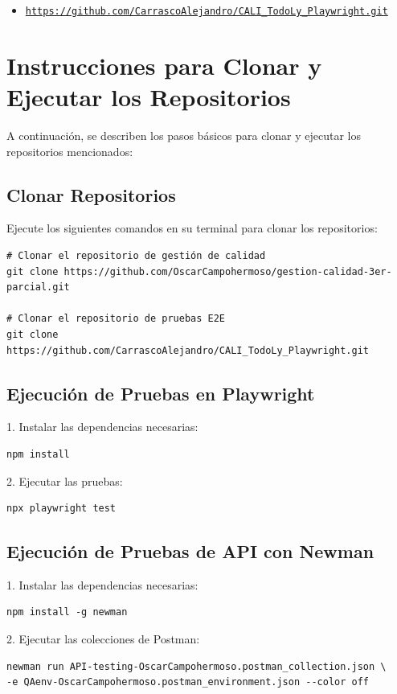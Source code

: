 \documentclass{report}
\begin{document}
\begin{itemize}
    \item \href{https://github.com/CarrascoAlejandro/CALI_TodoLy_Playwright.git}{\texttt{https://github.com/CarrascoAlejandro/CALI\_TodoLy\_Playwright.git}}
\end{itemize}

\section{Instrucciones para Clonar y Ejecutar los Repositorios}

A continuación, se describen los pasos básicos para clonar y ejecutar los repositorios mencionados:

\subsection{Clonar Repositorios}
Ejecute los siguientes comandos en su terminal para clonar los repositorios:
\begin{verbatim}
# Clonar el repositorio de gestión de calidad
git clone https://github.com/OscarCampohermoso/gestion-calidad-3er-parcial.git

# Clonar el repositorio de pruebas E2E
git clone https://github.com/CarrascoAlejandro/CALI_TodoLy_Playwright.git
\end{verbatim}

\subsection{Ejecución de Pruebas en Playwright}
1. Instalar las dependencias necesarias:
\begin{verbatim}
npm install
\end{verbatim}

2. Ejecutar las pruebas:
\begin{verbatim}
npx playwright test
\end{verbatim}

\subsection{Ejecución de Pruebas de API con Newman}
1. Instalar las dependencias necesarias:
\begin{verbatim}
npm install -g newman
\end{verbatim}

2. Ejecutar las colecciones de Postman:
\begin{verbatim}
newman run API-testing-OscarCampohermoso.postman_collection.json \
-e QAenv-OscarCampohermoso.postman_environment.json --color off
\end{verbatim}
\end{document}
